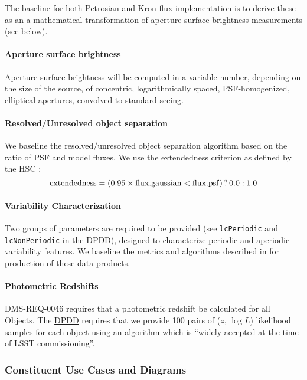 \documentclass[12pt]{article}
\newcommand{\ds}[2]{{\color{blue} \href{https://docushare.lsstcorp.org/docushare/dsweb/Get/#1}{#2}}\xspace}
\newcommand{\DPDD}{\ds{LSE-163}{DPDD}}
\begin{document}
The baseline for both Petrosian and Kron flux implementation is to derive these as an a mathematical transformation of aperture surface brightness measurements (see below).

\paragraph{Aperture surface brightness} Aperture surface brightness will be computed in a variable number, depending on the size of the source, of concentric, logarithmically spaced, PSF-homogenized, elliptical apertures, convolved to standard seeing.

\paragraph{Resolved/Unresolved object separation}
\label{alg:star-galaxy}

We baseline the resolved/unresolved object separation algorithm based on the ratio of PSF and model fluxes. We use the extendedness criterion as defined by the HSC \cite{Furusawa14}:
\begin{equation}
{\rm extendedness} = (0.95\times {\rm flux.gaussian} < {\rm flux.psf})\, ?\, 0.0 : 1.0 \nonumber
\end{equation}

\paragraph{Variability Characterization}

Two groups of parameters are required to be provided (see {\tt lcPeriodic} and {\tt lcNonPeriodic} in the \DPDD), designed to characterize periodic and aperiodic variability features. We baseline the metrics and algorithms described in \cite{Richards11} for production of these data products.

\paragraph{Photometric Redshifts}

DMS-REQ-0046 requires that a photometric redshift be calculated for all Objects. The \DPDD{} requires that we provide 100 pairs of ($z$, $\log L$) likelihood samples for each object using an algorithm which is ``widely accepted at the time of LSST commissioning''.

\subsubsection{Constituent Use Cases and Diagrams}
\end{document}
